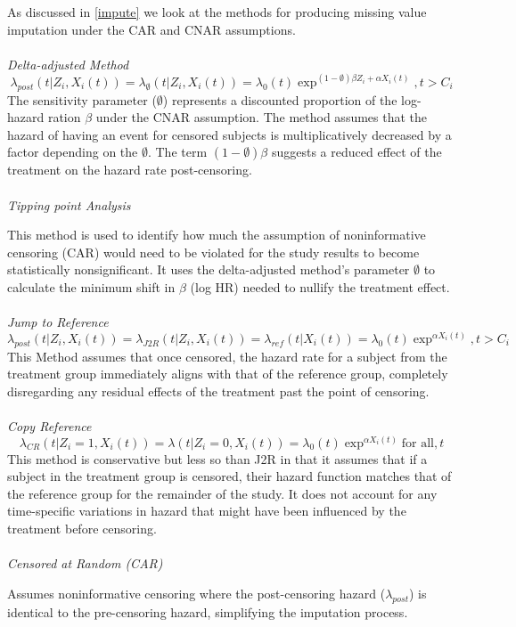 As discussed in \ref{impute} we look at the methods for producing missing value imputation under the CAR and CNAR assumptions.
\\\\
\textit{Delta-adjusted Method} \parencite{jin_imputation_2024}
\begin{equation} \label{eq:deltaadjust}\lambda_{post}(t|Z_{i},X_{i}(t)) = \lambda_{\emptyset}(t|Z_{i},X_{i}(t)) = \lambda_{0}(t)\exp^{(1-\emptyset)\beta Z_{i} + \alpha X_{i}(t)}, t>C_{i}\end{equation}
\noindent The sensitivity parameter (\(\emptyset\)) represents a discounted proportion of the log-hazard ration \(\beta\) under the CNAR assumption. The method assumes that the hazard of having an event for censored subjects is multiplicatively decreased by a factor depending on the \(\emptyset\). The term \((1- \emptyset)\beta\) suggests a reduced effect of the treatment on the hazard rate post-censoring.
\\\\
\textit{Tipping point Analysis} \parencite{jin_imputation_2024}
\par \noindent This method is used to identify how much the assumption of noninformative censoring (CAR) would need to be violated for the study results to become statistically nonsignificant. It uses the delta-adjusted method's parameter \(\emptyset\) to calculate the minimum shift in \(\beta\) (log HR) needed to nullify the treatment effect.
\\\\
\textit{Jump to Reference} \parencite{jin_imputation_2024}
\begin{equation} \label{eq:jtor}\lambda_{post}(t|Z_{i},X_{i}(t)) = \lambda_{J2R}(t|Z_{i},X_{i}(t)) = \lambda_{ref}(t|X_{i}(t)) = \lambda_{0}(t)\exp^{\alpha X_{i}(t)}, t>C_{i}\end{equation}
\noindent This Method assumes that once censored, the hazard rate for a subject from the treatment group immediately aligns with that of the reference group, completely disregarding any residual effects of the treatment past the point of censoring.
\\\\
\textit{Copy Reference} \parencite{jin_imputation_2024}
\begin{equation} \label{eq:copyref}\lambda_{CR}(t|Z_{i} = 1,X_{i}(t)) = \lambda(t|Z_{i} = 0, X_{i}(t)) = \lambda_{0}(t)\exp^{\alpha X_{i}(t)} \text{for all}, t\end{equation}
\noindent This method is conservative but less so than J2R in that it assumes that if a subject in the treatment group is censored, their hazard function matches that of the reference group for the remainder of the study. It does not account for any time-specific variations in hazard that might have been influenced by the treatment before censoring.
\\\\
\textit{Censored at Random (CAR)} \parencite{jin_imputation_2024}
\par \noindent Assumes noninformative censoring where the post-censoring hazard (\(\lambda_{post}\)) is identical to the pre-censoring hazard, simplifying the imputation process.

